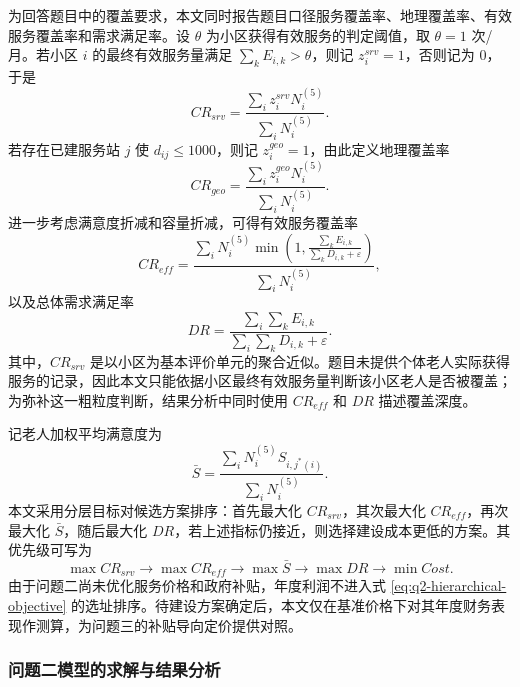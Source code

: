 为回答题目中的覆盖要求，本文同时报告题目口径服务覆盖率、地理覆盖率、有效服务覆盖率和需求满足率。设 $\theta$ 为小区获得有效服务的判定阈值，取 $\theta=1$ 次/月。若小区 $i$ 的最终有效服务量满足 $\sum_kE_{i,k}>\theta$，则记 $z_i^{srv}=1$，否则记为 $0$，于是
\begin{equation}
  CR_{srv}=
  \frac{\sum_i z_i^{srv}N_i^{(5)}}{\sum_iN_i^{(5)}}.
  \label{eq:q2-cr-srv}
\end{equation}
若存在已建服务站 $j$ 使 $d_{ij}\le1000$，则记 $z_i^{geo}=1$，由此定义地理覆盖率
\begin{equation}
  CR_{geo}=
  \frac{\sum_i z_i^{geo}N_i^{(5)}}{\sum_iN_i^{(5)}}.
  \label{eq:q2-cr-geo}
\end{equation}
进一步考虑满意度折减和容量折减，可得有效服务覆盖率
\begin{equation}
  CR_{eff}=
  \frac{
    \sum_iN_i^{(5)}
    \min\left(
      1,\frac{\sum_kE_{i,k}}{\sum_kD_{i,k}+\varepsilon}
    \right)
  }
  {\sum_iN_i^{(5)}},
  \label{eq:q2-cr-eff}
\end{equation}
以及总体需求满足率
\begin{equation}
  DR=
  \frac{\sum_i\sum_kE_{i,k}}
  {\sum_i\sum_kD_{i,k}+\varepsilon}.
  \label{eq:q2-demand-rate}
\end{equation}
其中，$CR_{srv}$ 是以小区为基本评价单元的聚合近似。题目未提供个体老人实际获得服务的记录，因此本文只能依据小区最终有效服务量判断该小区老人是否被覆盖；为弥补这一粗粒度判断，结果分析中同时使用 $CR_{eff}$ 和 $DR$ 描述覆盖深度。

记老人加权平均满意度为
\begin{equation}
  \bar S=
  \frac{\sum_iN_i^{(5)}S_{i,j^*(i)}}{\sum_iN_i^{(5)}}.
  \label{eq:q2-weighted-satisfaction}
\end{equation}
本文采用分层目标对候选方案排序：首先最大化 $CR_{srv}$，其次最大化 $CR_{eff}$，再次最大化 $\bar S$，随后最大化 $DR$，若上述指标仍接近，则选择建设成本更低的方案。其优先级可写为
\begin{equation}
  \max CR_{srv}
  \rightarrow
  \max CR_{eff}
  \rightarrow
  \max \bar S
  \rightarrow
  \max DR
  \rightarrow
  \min Cost.
  \label{eq:q2-hierarchical-objective}
\end{equation}
由于问题二尚未优化服务价格和政府补贴，年度利润不进入式 \eqref{eq:q2-hierarchical-objective} 的选址排序。待建设方案确定后，本文仅在基准价格下对其年度财务表现作测算，为问题三的补贴导向定价提供对照。

\subsubsection{问题二模型的求解与结果分析}

